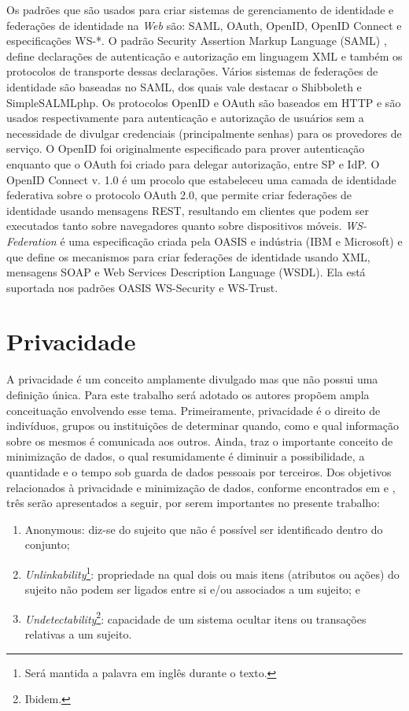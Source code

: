 \documentclass{doublecol-new}
\begin{document}
Os padrões que são usados para criar sistemas de gerenciamento de identidade e federações de identidade na \textit{Web} são:  SAML, OAuth, OpenID, OpenID Connect e especificações WS-*. O padrão Security Assertion Markup Language (SAML) \cite{ragouzis2008security}, define declarações de autenticação e autorização em linguagem XML e também os protocolos de transporte dessas declarações. Vários sistemas de federações de identidade são baseadas no SAML, dos quais vale destacar o Shibboleth \cite{erdos2002shibboleth} e SimpleSALMLphp. Os protocolos OpenID\cite{openid2015} e OAuth\cite{hardt2012oauth} são baseados em HTTP e são usados respectivamente para autenticação e autorização de usuários sem a necessidade de divulgar credenciais (principalmente senhas) para os provedores de serviço. O OpenID foi originalmente especificado para prover autenticação enquanto que o OAuth foi criado para delegar autorização, entre SP e IdP. O OpenID Connect v. 1.0 \cite{sakimura2014openidconnect} é um procolo que estabeleceu uma camada de identidade federativa sobre o protocolo OAuth 2.0, que permite criar federações de identidade usando mensagens REST, resultando em clientes que podem ser executados tanto sobre navegadores quanto sobre dispositivos móveis. \textit{WS-Federation} \cite{goodner2009ws} é uma especificação criada pela OASIS e indústria (IBM e Microsoft) e que define os mecanismos para criar federações de identidade usando XML, mensagens SOAP e Web Services Description Language (WSDL). Ela está suportada nos padrões OASIS WS-Security e WS-Trust.
	
\section{Privacidade}

A privacidade é um conceito amplamente divulgado mas que não possui uma definição única. Para este trabalho será adotado os autores \cite{pfitzmann2010terminology} propõem ampla conceituação envolvendo esse tema. Primeiramente, privacidade é o direito de indivíduos, grupos ou instituições de determinar quando, como e qual informação sobre os mesmos é comunicada aos outros. Ainda, traz o importante conceito de minimização de dados, o qual resumidamente é diminuir a possibilidade, a quantidade e o tempo sob guarda de dados pessoais por terceiros. Dos objetivos relacionados à privacidade e minimização de dados, conforme encontrados em \cite{pfitzmann2010terminology} e \cite{deng2011privacy}, três serão apresentados a seguir, por serem importantes no presente trabalho:
\begin{enumerate}
	\item Anonymous: diz-se do sujeito que não é possível ser identificado dentro do conjunto;
	\item \textit{Unlinkability}\footnote{Será mantida a palavra em inglês durante o texto.}: propriedade na qual dois ou mais itens (atributos ou ações) do sujeito não podem ser ligados entre si e/ou associados a um sujeito; e
	\item \textit{Undetectability}\footnote{Ibidem.}: capacidade de um sistema ocultar itens ou transações relativas a um sujeito.
\end{enumerate}
\end{document}
